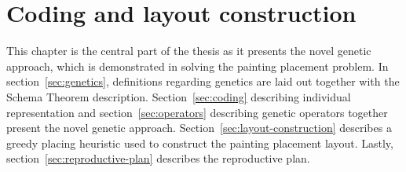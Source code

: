\chapter{Coding and layout construction}\label{ch:coding-and-layout-construction}

This chapter is the central part of the thesis
as it presents the novel genetic approach, which is demonstrated in solving the painting placement problem.
In section~\ref{sec:genetics}, definitions regarding genetics are laid out together with the Schema Theorem description.
Section~\ref{sec:coding} describing individual representation and section~\ref{sec:operators}
describing genetic operators together present the novel genetic approach.
Section~\ref{sec:layout-construction} describes a greedy placing heuristic
used to construct the painting placement layout.
Lastly, section~\ref{sec:reproductive-plan} describes the reproductive plan.






